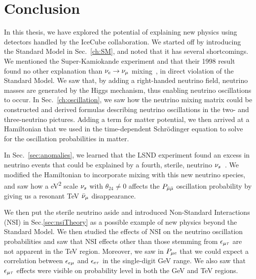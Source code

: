 \chapter{Conclusion}\label{ch:conc}
In this thesis, we have explored the potential of explaining new physics using detectors handled by the IceCube collaboration.
We started off by introducing the Standard Model in Sec.~\ref{ch:SM}, and noted that it has several shortcomings. 
We mentioned the Super-Kamiokande experiment and that their 1998 result found no other explanation than $\nu_e \to \nu_\mu$ mixing~\cite{sk1998}, in direct violation of the Standard Model. 
We saw that, by adding a right-handed neutrino field, neutrino masses are generated by the Higgs mechanism, thus enabling neutrino oscillations to occur. 
In Sec.~\ref{ch:oscillation}, we saw how the neutrino mixing matrix could be constructed and derived formulas describing neutrino oscillations in the two- and three-neutrino pictures. Adding a term for matter potential,
we then arrived at a Hamiltonian that we used in the time-dependent Schrödinger equation to solve for the oscillation probabilities in matter.

In Sec.~\ref{sec:anomalies}, we learned that the LSND experiment found an excess in neutrino events that could be explained by a fourth, sterile, neutrino $\nu_s$~\cite{lsnd}.
We modified the Hamiltonian to incorporate mixing with this new neutrino species, and saw how a \si{\eV^2} scale  $\nu_s$ with $\theta_{24}\neq 0$ affects the $P_{\bar{\mu} \bar{\mu}}$ oscillation probability 
by giving us a resonant \si{\TeV} $\bar{\nu}_\mu$ disappearance.

We then put the sterile neutrino aside and introduced Non-Standard Interactions (NSI) in Sec.\ref{sec:nsiTheory} as a possible example of new physics beyond the Standard Model.
We then studied the effects of NSI on the neutrino oscillation probabilities and saw that NSI effects other than those stemming from $\epsilon_{\mu\tau}$ are not apparent in the \si{\TeV} region.
Moreover, we saw in $P_{\mu e}$ that we could expect a correlation between $\epsilon_{e\mu}$ and $\epsilon_{e\tau}$ in the single-digit \si{\GeV} range.
We also saw that $\epsilon_{\mu\tau}$ effects were visible on probability level in both the \si{\GeV} and \si{\TeV} regions.

